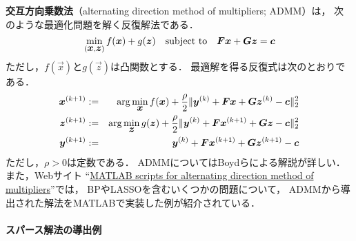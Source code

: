 \iffalse
{\bf IST}（iterative soft shrinkage）\cite{Daubechies04}と呼ばれる
次のようなソフト閾値処理の反復計算による解法が導出される．
\begin{algorithm}[h]
\caption{Iterative soft shrinkage: $\vec x = \mbox{\sc IST}(\vec b,\mtr A,L,\lambda,\delta)$}
\label{alg:IST}
\begin{algorithmic}[1]
\REQUIRE
$\vec b$: $m$次元ベクトル，$\mtr A$: $m\times n$行列，
$\lambda$: 定数，$L$: Lipschitz定数，$\delta$: 許容誤差;
\ENSURE $\vec x$: スパースな$n$次元ベクトル;
\STATE
$\vec x$を初期化する（例えば$\vec x\subs\vec 0\in\mathbb{R}^{n}$）;
\STATE
$\vec r\subs \vec b-\mtr A\vec x$;
\WHILE{$\|\vec r\|_2/\|\vec b\|_2>\delta$}
\STATE
$\vec r\subs\vec b-\mtr A\vec x$;
\STATE
$\vec x\subs\soft(\vec x+\frac{1}{L}\mtr A^\top\vec r,\frac{\lambda}{L})$;
\ENDWHILE
\end{algorithmic}
\end{algorithm}
\fi




{\bf 交互方向乗数法}（alternating direction method of multipliers; ADMM）\cite{GabayMercier76}は，
次のような最適化問題を解く反復解法である．
\begin{equation}
 \min_{(\mbox{\boldmath $x$},\mbox{\boldmath $z$})}f(\mbox{\boldmath $x$})+g(\mbox{\boldmath $z$})\quad\mbox{subject to}\quad\mbox{\boldmath $F$}\mbox{\boldmath $x$}+\mbox{\boldmath $G$}\mbox{\boldmath $z$}=\mbox{\boldmath $c$}
\label{eq:ADMM objective}
\end{equation}
ただし，$f(\vec x)$と$g(\vec z)$は凸関数とする．
最適解を得る反復式は次のとおりである．
\begin{eqnarray}
\mbox{\boldmath $x$}^{(k+1)} &:= & \arg\min_{\mbox{\boldmath $x$}} f(\mbox{\boldmath $x$})+\frac{\rho}{2}\|\mbox{\boldmath $y$}^{(k)}+\mbox{\boldmath $F$}\mbox{\boldmath $x$}+\mbox{\boldmath $G$}\mbox{\boldmath $z$}^{(k)}-\mbox{\boldmath $c$}\|_2^2\label{eq:ADMM x update}\\
\mbox{\boldmath $z$}^{(k+1)} & := & \arg\min_{\mbox{\boldmath $z$}} g(\mbox{\boldmath $z$})+\frac{\rho}{2}\|\mbox{\boldmath $y$}^{(k)}+\mbox{\boldmath $F$}\mbox{\boldmath $x$}^{(k+1)}+\mbox{\boldmath $G$}\mbox{\boldmath $z$}-\mbox{\boldmath $c$}\|_2^2\label{eq:ADMM z update}\\
\mbox{\boldmath $y$}^{(k+1)}& := & \mbox{\boldmath $y$}^{(k)}+\mbox{\boldmath $F$}\mbox{\boldmath $x$}^{(k+1)}+\mbox{\boldmath $G$}\mbox{\boldmath $z$}^{(k+1)}-\mbox{\boldmath $c$}\label{eq:ADMM Lagrange update}
\end{eqnarray}
ただし，$\rho>0$は定数である．
ADMMについてはBoydらによる解説\cite{Boyd11}が詳しい．
また，Webサイト
``\href{http://stanford.edu/~boyd/papers/admm/}{MATLAB scripts for alternating direction method of multipliers}''では，
BPやLASSOを含むいくつかの問題について，
ADMMから導出された解法をMATLABで実装した例が紹介されている．


\paragraph{スパース解法の導出例}

